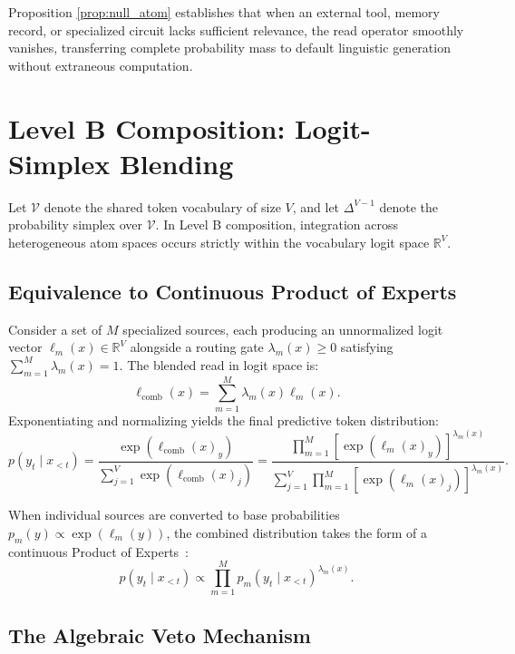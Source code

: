 \documentclass[preprint,12pt]{elsarticle}
\begin{document}
Proposition \ref{prop:null_atom} establishes that when an external tool, memory record, or specialized circuit lacks sufficient relevance, the read operator smoothly vanishes, transferring complete probability mass to default linguistic generation without extraneous computation.

\section{Level B Composition: Logit-Simplex Blending}

Let $\mathcal{V}$ denote the shared token vocabulary of size $V$, and let $\Delta^{V-1}$ denote the probability simplex over $\mathcal{V}$. In Level B composition, integration across heterogeneous atom spaces occurs strictly within the vocabulary logit space $\mathbb{R}^V$.

\subsection{Equivalence to Continuous Product of Experts}

Consider a set of $M$ specialized sources, each producing an unnormalized logit vector $\ell_m(x) \in \mathbb{R}^V$ alongside a routing gate $\lambda_m(x) \ge 0$ satisfying $\sum_{m=1}^M \lambda_m(x) = 1$. The blended read in logit space is:
\begin{equation}
\ell_{\mathrm{comb}}(x) = \sum_{m=1}^M \lambda_m(x) \ell_m(x).
\end{equation}
Exponentiating and normalizing yields the final predictive token distribution:
\begin{equation}
p(y_t \mid x_{<t}) = \frac{\exp(\ell_{\mathrm{comb}}(x)_y)}{\sum_{j=1}^V \exp(\ell_{\mathrm{comb}}(x)_j)} = \frac{\prod_{m=1}^M \left[ \exp(\ell_m(x)_y) \right]^{\lambda_m(x)}}{\sum_{j=1}^V \prod_{m=1}^M \left[ \exp(\ell_m(x)_j) \right]^{\lambda_m(x)}}.
\end{equation}

When individual sources are converted to base probabilities $p_m(y) \propto \exp(\ell_m(y))$, the combined distribution takes the form of a continuous Product of Experts~\cite{hinton2002training}:
\begin{equation}
p(y_t \mid x_{<t}) \propto \prod_{m=1}^M p_m(y_t \mid x_{<t})^{\lambda_m(x)}.
\label{eq:poe}
\end{equation}

\subsection{The Algebraic Veto Mechanism}
\end{document}

